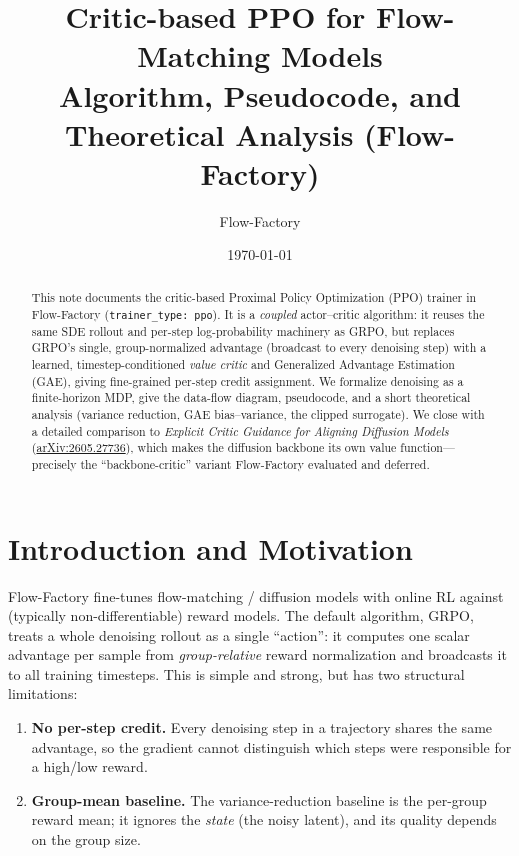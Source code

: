 \documentclass[11pt]{article}
\title{\textbf{Critic-based PPO for Flow-Matching Models}\\[2pt]
\large Algorithm, Pseudocode, and Theoretical Analysis (Flow-Factory)}
\author{Flow-Factory}
\date{\today}
\theoremstyle{plain}
\theoremstyle{remark}
\begin{document}
\maketitle

\begin{abstract}
This note documents the critic-based Proximal Policy Optimization (PPO) trainer in
Flow-Factory (\texttt{trainer\_type: ppo}). It is a \emph{coupled} actor--critic
algorithm: it reuses the same SDE rollout and per-step log-probability machinery as
GRPO, but replaces GRPO's single, group-normalized advantage (broadcast to every
denoising step) with a learned, timestep-conditioned \emph{value critic} and
Generalized Advantage Estimation (GAE), giving fine-grained per-step credit
assignment. We formalize denoising as a finite-horizon MDP, give the data-flow
diagram, pseudocode, and a short theoretical analysis (variance reduction, GAE
bias--variance, the clipped surrogate). We close with a detailed comparison to
\emph{Explicit Critic Guidance for Aligning Diffusion Models}
(\href{https://arxiv.org/abs/2605.27736}{arXiv:2605.27736}), which makes the
diffusion backbone its own value function---precisely the ``backbone-critic''
variant Flow-Factory evaluated and deferred.
\end{abstract}

\tableofcontents

\section{Introduction and Motivation}
\label{sec:intro}

Flow-Factory fine-tunes flow-matching / diffusion models with online RL against
(typically non-differentiable) reward models. The default algorithm, GRPO, treats a
whole denoising rollout as a single ``action'': it computes one scalar advantage per
sample from \emph{group-relative} reward normalization and broadcasts it to all
training timesteps. This is simple and strong, but has two structural limitations:

\begin{enumerate}[leftmargin=1.4em]
  \item \textbf{No per-step credit.} Every denoising step in a trajectory shares the
  same advantage, so the gradient cannot distinguish which steps were responsible
  for a high/low reward.
  \item \textbf{Group-mean baseline.} The variance-reduction baseline is the per-group
  reward mean; it ignores the \emph{state} (the noisy latent), and its quality
  depends on the group size.
\end{enumerate}
\end{document}
